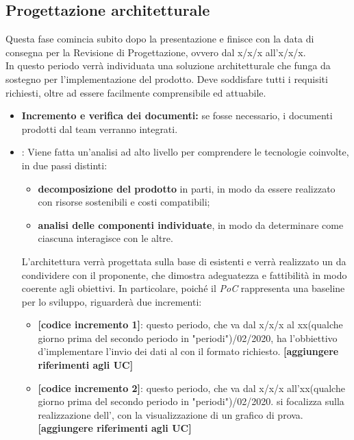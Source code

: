 \subsection{Progettazione architetturale}
Questa fase comincia subito dopo la presentazione e finisce con la data di consegna per la Revisione di Progettazione, ovvero dal x/x/x all'x/x/x.\\
In questo periodo verrà individuata una soluzione architetturale che funga da sostegno per l'implementazione del prodotto. Deve soddisfare tutti i requisiti richiesti, oltre ad essere facilmente comprensibile ed attuabile. 
\begin{itemize}
\item \textbf{Incremento e verifica dei documenti:} se fosse necessario, i documenti prodotti dal team verranno integrati.

 \item {}: Viene fatta un'analisi ad alto livello per comprendere le tecnologie coinvolte, in due passi distinti:
\begin{itemize}
 \item \textbf{decomposizione del prodotto} in parti, in modo da essere realizzato con risorse sostenibili e costi compatibili;
 \item \textbf{analisi delle componenti individuate}, in modo da determinare come ciascuna interagisce con le altre.  
\end{itemize}
L'architettura verrà progettata sulla base di  esistenti e verrà realizzato un  da condividere con il proponente, che dimostra adeguatezza e fattibilità in modo coerente agli obiettivi. In particolare, poiché il \textit{PoC} rappresenta una baseline per lo sviluppo, riguarderà due incrementi:
\begin{itemize}
	\item \textbf{[codice incremento 1]}: questo periodo, che va dal x/x/x al xx(qualche giorno prima del secondo periodo in "periodi")/02/2020, ha l'obbiettivo d'implementare l'invio dei dati al  con il formato richiesto. \textbf{[aggiungere riferimenti agli UC]}
	\item \textbf{[codice incremento 2]}: questo periodo, che va dal x/x/x all'xx(qualche giorno prima del secondo periodo in "periodi")/02/2020. si focalizza   sulla realizzazione dell', con la visualizzazione di un grafico di prova. \textbf{[aggiungere riferimenti agli UC]}
\end{itemize} 

\end{itemize}

